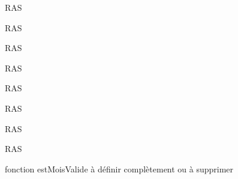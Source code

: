
\begin{DoxyRefList}
\item[\label{todo__todo000001}%
\hypertarget{todo__todo000001}{}%
Namespace \hyperlink{namespacedefault}{default} ]R\+A\+S 

R\+A\+S 

R\+A\+S 

R\+A\+S 

R\+A\+S 

R\+A\+S 

R\+A\+S 

R\+A\+S 

fonction est\+Mois\+Valide à définir complètement ou à supprimer 
\end{DoxyRefList}